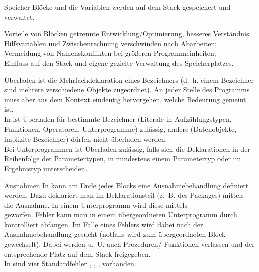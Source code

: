\begin{Def}{Speicher}
    Blöcke und die Variablen werden auf dem Stack gespeichert und verwaltet.
\end{Def}

\begin{Def}{Vorteile von Blöcken}
    getrennte Entwicklung/Optimierung, besseres Verständnis; \\
    Hilfsvariablen und Zwischenrechnung verschwinden nach Abarbeiten; \\
    Vermeidung von Namenskonflikten bei größeren Programmeinheiten; \\
    Einfluss auf den Stack und eigene gezielte Verwaltung des Speicherplatzes.
\end{Def}

\begin{Def}{Überladen}
     ist die Mehrfachdeklaration eines Bezeichners
    (d.~h. einem Bezeichner sind mehrere verschiedene Objekte zugeordnet).
    An jeder Stelle des Programms muss aber aus dem Kontext eindeutig
    hervorgehen, welche Bedeutung gemeint ist. \\
    In \Ada{} ist Überladen für bestimmte Bezeichner (Literale in
    Aufzählungstypen, Funktionen, Operatoren, Unterprogramme) zulässig,
    andere (Datenobjekte, implizite Bezeichner) dürfen nicht überladen
    werden. \\
    Bei Unterprogrammen ist Überladen zulässig, falls sich die Deklarationen
    in der Reihenfolge der Parametertypen, in mindestens einem Parametertyp
    oder im Ergebnistyp unterscheiden.
\end{Def}

\begin{Def}{Ausnahmen}
    In \Ada{} kann am Ende jedes Blocks eine Ausnahmebehandlung definiert
    werden.
    Dazu deklariert man im Deklarationsteil (z.~B. des Packages) mittels \\
     die Ausnahme.
    In einem Unterprogramm wird diese mittels \\
     geworfen.
    Fehler kann man in einem übergeordneten Unterprogramm
    durch  \\
    kontrolliert abfangen.
    Im Falle eines Fehlers wird dabei nach der Ausnahmebehandlung gesucht
    (notfalls wird zum übergeordneten Block gewechselt).
    Dabei werden u.~U. auch Prozeduren/ Funktionen verlassen und der
    entsprechende Platz auf dem Stack freigegeben. \\
    In \Ada{} sind vier Standardfehler ,
    , , 
    vorhanden.
\end{Def}

